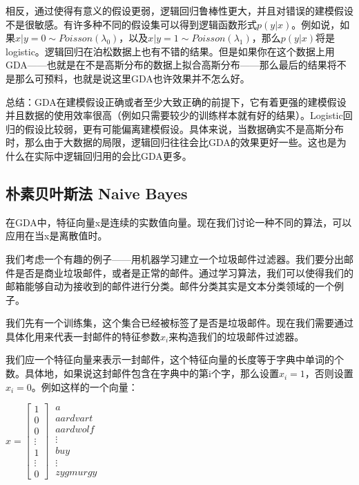 \documentclass[UTF8]{ctexart}
\begin{document}
相反，通过使得有意义的假设更弱，逻辑回归鲁棒性更大，并且对错误的建模假设不是很敏感。有许多种不同的假设集可以得到逻辑函数形式$p(y|x )$。例如说，如果$x|y=0 \sim Poisson(\lambda_{0})$，以及$x|y=1 \sim Poisson(\lambda_{1})$，那么$p(y|x)$将是logistic。逻辑回归在泊松数据上也有不错的结果。但是如果你在这个数据上用GDA——也就是在不是高斯分布的数据上拟合高斯分布——那么最后的结果将不是那么可预料，也就是说这里GDA也许效果并不怎么好。

总结：GDA在建模假设正确或者至少大致正确的前提下，它有着更强的建模假设并且数据的使用效率很高（例如只需要较少的训练样本就有好的结果）。Logistic回归的假设比较弱，更有可能偏离建模假设。具体来说，当数据确实不是高斯分布时，那么由于大数据的局限，逻辑回归往往会比GDA的效果更好一些。这也是为什么在实际中逻辑回归用的会比GDA更多。

\subsection{朴素贝叶斯法 Naive Bayes}


在GDA中，特征向量x是连续的实数值向量。现在我们讨论一种不同的算法，可以应用在当x是离散值时。



我们考虑一个有趣的例子——用机器学习建立一个垃圾邮件过滤器。我们要分出邮件是否是商业垃圾邮件，或者是正常的邮件。通过学习算法，我们可以使得我们的邮箱能够自动为接收到的邮件进行分类。邮件分类其实是文本分类领域的一个例子。

我们先有一个训练集，这个集合已经被标签了是否是垃圾邮件。现在我们需要通过具体化用来代表一封邮件的特征参数$x_{i}$来构造我们的垃圾邮件过滤器。

我们应一个特征向量来表示一封邮件，这个特征向量的长度等于字典中单词的个数。具体地，如果说这封邮件包含在字典中的第i个字，那么设置$x_{i}=1$，否则设置$x_{i}=0$。例如这样的一个向量：

\begin{center}
$x = \begin{bmatrix} 1 \\ 0 \\ 0\\ \vdots \\ 1 \\ \vdots \\0 \end{bmatrix} \ \begin{matrix} a \\ aardvart \\ aardwolf \\ \vdots \\ buy \\ \vdots \\zygmurgy \end{matrix}
$
\end{center}
\end{document}

